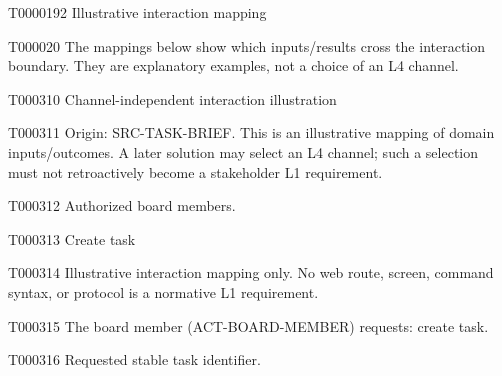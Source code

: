 \documentclass[11pt,a4paper]{article}
\begin{document}
\begin{atlasheading}{T000019}{2}
Illustrative interaction mapping
\end{atlasheading}
\begin{atlasparagraph}{T000020}
The mappings below show which inputs/results cross the interaction boundary. They are explanatory examples, not a choice of an L4 channel.
\end{atlasparagraph}
\begin{atlastext}{T000310}
Channel-independent interaction illustration
\end{atlastext}
\begin{atlasparagraph}{T000311}
Origin: SRC-TASK-BRIEF. This is an illustrative mapping of domain inputs/outcomes. A later solution may select an L4 channel; such a selection must not retroactively become a stakeholder L1 requirement.
\end{atlasparagraph}
\begin{atlasparagraph}{T000312}
Authorized board members.
\end{atlasparagraph}
\begin{atlastext}{T000313}
Create task
\end{atlastext}
\begin{atlasparagraph}{T000314}
Illustrative interaction mapping only. No web route, screen, command syntax, or protocol is a normative L1 requirement.
\end{atlasparagraph}
\begin{atlasparagraph}{T000315}
The board member (ACT-BOARD-MEMBER) requests: create task.
\end{atlasparagraph}
\begin{atlasparagraph}{T000316}
Requested stable task identifier.
\end{atlasparagraph}
\end{document}
